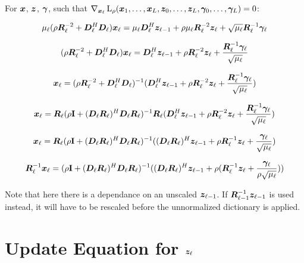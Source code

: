 \documentclass{article}
\begin{document}
For $\bm{x}$, $\bm{z}$, $\bm{\gamma}$, such that $\nabla_{\bm{x}_{\ell}} \operatorname{L}_{\rho}(\bm{x}_1,\hdots,\bm{x}_L,\bm{z}_0,\hdots,\bm{z}_L,\bm{\gamma}_0,\hdots,\bm{\gamma}_L) = 0$:

\begin{equation}
\mu_{\ell}(\rho \bm{R}_{\ell}^{-2} + \bm{D}_{\ell}^H\bm{D}_{\ell})\bm{x}_{\ell} = \mu_{\ell}\bm{D}_{\ell}^H\bm{z}_{\ell - 1} + \rho \mu_{\ell}\bm{R}_{\ell}^{-2}\bm{z}_{\ell} + \sqrt{\mu_{\ell}}\bm{R}_{\ell}^{-1}\bm{\gamma}_{\ell}
\end{equation}

\begin{equation}
(\rho \bm{R}_{\ell}^{-2} + \bm{D}_{\ell}^H\bm{D}_{\ell})\bm{x}_{\ell} = \bm{D}_{\ell}^H\bm{z}_{\ell - 1} + \rho \bm{R}_{\ell}^{-2}\bm{z}_{\ell} + \frac{\bm{R}_{\ell}^{-1}\bm{\gamma}_{\ell}}{\sqrt{\mu_{\ell}}}
\end{equation}

\begin{equation}
\bm{x}_{\ell} = (\rho \bm{R}_{\ell}^{-2} + \bm{D}_{\ell}^H\bm{D}_{\ell})^{-1}(\bm{D}_{\ell}^H\bm{z}_{\ell - 1} + \rho \bm{R}_{\ell}^{-2}\bm{z}_{\ell} + \frac{\bm{R}_{\ell}^{-1}\bm{\gamma}_{\ell}}{\sqrt{\mu_{\ell}}})
\end{equation}

\begin{equation}
\bm{x}_{\ell} = \bm{R}_{\ell}(\rho {\bf I} + (\bm{D}_{\ell}\bm{R}_{\ell})^H\bm{D}_{\ell}\bm{R}_{\ell})^{-1}\bm{R}_{\ell}(\bm{D}_{\ell}^H\bm{z}_{\ell - 1} + \rho \bm{R}_{\ell}^{-2}\bm{z}_{\ell} + \frac{\bm{R}_{\ell}^{-1}\bm{\gamma}_{\ell}}{\sqrt{\mu_{\ell}}})
\end{equation}

\begin{equation}
\bm{x}_{\ell} = \bm{R}_{\ell}(\rho {\bf I} + (\bm{D}_{\ell}\bm{R}_{\ell})^H\bm{D}_{\ell}\bm{R}_{\ell})^{-1}((\bm{D}_{\ell}\bm{R}_{\ell})^H\bm{z}_{\ell - 1} + \rho \bm{R}_{\ell}^{-1}\bm{z}_{\ell} + \frac{\bm{\gamma}_{\ell}}{\sqrt{\mu_{\ell}}})
\end{equation}

\begin{equation}
\bm{R}_{\ell}^{-1}\bm{x}_{\ell} = (\rho {\bf I} + (\bm{D}_{\ell}\bm{R}_{\ell})^H\bm{D}_{\ell}\bm{R}_{\ell})^{-1}((\bm{D}_{\ell}\bm{R}_{\ell})^H\bm{z}_{\ell - 1} + \rho (\bm{R}_{\ell}^{-1}\bm{z}_{\ell} + \frac{\bm{\gamma}_{\ell}}{\rho\sqrt{\mu_{\ell}}}))
\end{equation}

Note that here there is a dependance on an unscaled $\bm{z}_{\ell - 1}$. If $\bm{R}_{\ell - 1}^{-1} \bm{z}_{\ell - 1}$ is used instead, it will have to be rescaled before the unnormalized dictionary is applied.

\section{Update Equation for $\bm{z}_{\ell}$}
\end{document}
